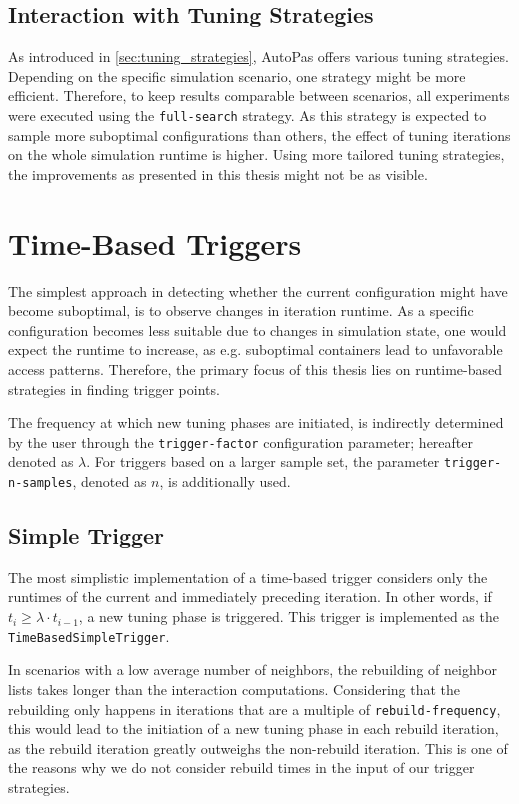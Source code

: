 \subsection{Interaction with Tuning Strategies}
As introduced in \autoref{sec:tuning_strategies}, AutoPas offers various tuning strategies. Depending on the specific simulation scenario, one strategy might be more efficient. Therefore, to keep results comparable between scenarios, all experiments were executed using the \texttt{full-search} strategy. As this strategy is expected to sample more suboptimal configurations than others, the effect of tuning iterations on the whole simulation runtime is higher. Using more tailored tuning strategies, the improvements as presented in this thesis might not be as visible.


\section{Time-Based Triggers}
\label{sec:time_base_triggers}
The simplest approach in detecting whether the current configuration might have become suboptimal, is to observe changes in iteration runtime. As a specific configuration becomes less suitable due to changes in simulation state, one would expect the runtime to increase, as e.g. suboptimal containers lead to unfavorable access patterns. Therefore, the primary focus of this thesis lies on runtime-based strategies in finding trigger points.

The frequency at which new tuning phases are initiated, is indirectly determined by the user through the \texttt{trigger-factor} configuration parameter; hereafter denoted as $\lambda$. For triggers based on a larger sample set, the parameter \texttt{trigger-n-samples}, denoted as $n$, is additionally used.

\subsection{Simple Trigger}
\label{subsec:simple_trigger}
The most simplistic implementation of a time-based trigger considers only the runtimes of the current and immediately preceding iteration. In other words, if $t_i \ge \lambda\cdot t_{i-1}$, a new tuning phase is triggered. This trigger is implemented as the \texttt{TimeBasedSimpleTrigger}.

In scenarios with a low average number of neighbors, the rebuilding of neighbor lists takes longer than the interaction computations. Considering that the rebuilding only happens in iterations that are a multiple of \texttt{rebuild-frequency}, this would lead to the initiation of a new tuning phase in each rebuild iteration, as the rebuild iteration greatly outweighs the non-rebuild iteration. This is one of the reasons why we do not consider rebuild times in the input of our trigger strategies.


